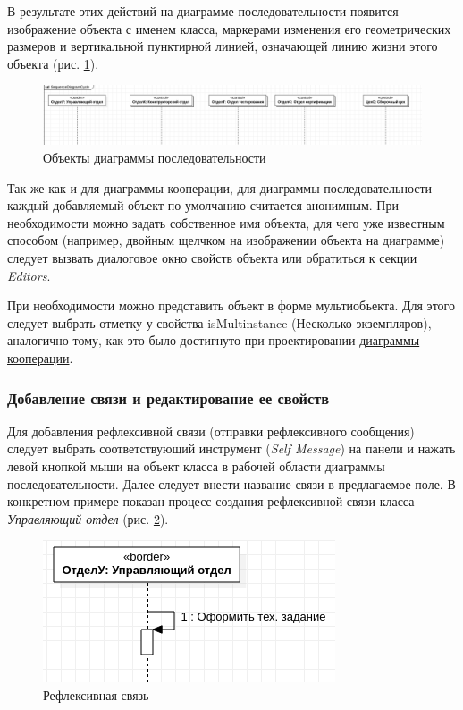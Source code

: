 \documentclass[a4paper,12pt]{report}
\begin{document}
В результате этих действий на диаграмме последовательности появится изображение объекта с именем класса, маркерами изменения его геометрических размеров и вертикальной пунктирной линией, означающей линию жизни этого объекта (рис. \ref{fig:sequenceobjects}).

\vspace{5ex}
\begin{figure}[h!]
	\centering
	\includegraphics[width=1\linewidth]{images/sequenceobjects}
	\caption{Объекты диаграммы последовательности}
	\label{fig:sequenceobjects}
\end{figure}

Так же как и для диаграммы кооперации, для диаграммы последовательности каждый добавляемый объект по умолчанию считается анонимным. При необходимости можно задать собственное имя объекта, для чего уже известным способом (например, двойным щелчком на изображении объекта на диаграмме) следует вызвать диалоговое окно свойств объекта или обратиться к секции \textit{Editors}.


При необходимости можно представить объект в форме мультиобъекта. Для этого следует выбрать отметку у свойства isMultinstance (Несколько экземпляров), аналогично тому, как это было достигнуто при проектировании \hyperref[multinstance]{диаграммы кооперации}.

\subsubsection*{Добавление связи и редактирование ее свойств}
Для добавления рефлексивной связи (отправки рефлексивного сообщения) следует выбрать соответствующий инструмент  (\textit{Self Message}) на панели и нажать левой кнопкой мыши на объект класса в рабочей области диаграммы последовательности. Далее следует внести название связи в предлагаемое поле. В конкретном примере показан процесс создания рефлексивной связи класса \textit{Управляющий отдел} (рис. \ref{fig:sequenceaction2}).

\begin{figure}[h!]
	\centering
	\includegraphics[width=0.7\linewidth]{images/sequenceaction2}
	\caption{Рефлексивная связь}
	\label{fig:sequenceaction2}
\end{figure}
\end{document}
